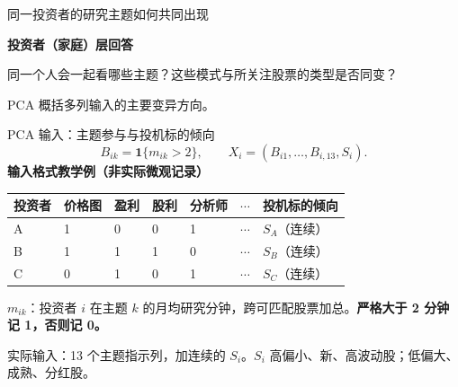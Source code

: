 \begin{frame}[label=pc-why]{同一投资者的研究主题如何共同出现}
  {\textbf{投资者（家庭）层回答}\par\small
    同一个人会一起看哪些主题？这些模式与所关注股票的类型是否同变？\par
    PCA 概括多列输入的主要变异方向。}
  \medskip
\end{frame}

\begin{frame}[label=pc-input]{PCA 输入：主题参与与投机标的倾向}
  \[
    B_{ik}=\mathbf{1}\{m_{ik}>2\},
    \qquad X_i=(B_{i1},\ldots,B_{i,13},S_i).
  \]
  \small
  \textbf{输入格式教学例（非实际微观记录）}\par\smallskip
  \begin{tabularx}{\linewidth}{@{}l*{5}{Y}L{.19\linewidth}@{}}
    \toprule 投资者 & 价格图 & 盈利 & 股利 & 分析师 & \(\cdots\) & 投机标的倾向\\\midrule
    A & 1 & 0 & 0 & 1 & \(\cdots\) & \(S_A\)（连续）\\
    B & 1 & 1 & 1 & 0 & \(\cdots\) & \(S_B\)（连续）\\
    C & 0 & 1 & 0 & 1 & \(\cdots\) & \(S_C\)（连续）\\\bottomrule
  \end{tabularx}\par\medskip
  \(m_{ik}\)：投资者 \(i\) 在主题 \(k\) 的月均研究分钟，跨可匹配股票加总。\textbf{严格大于 2 分钟记 1，否则记 0。}\par\smallskip
  实际输入：13 个主题指示列，加连续的 \(S_i\)。\(S_i\) 高偏小、新、高波动股；低偏大、成熟、分红股。
  \small{}
\end{frame}

